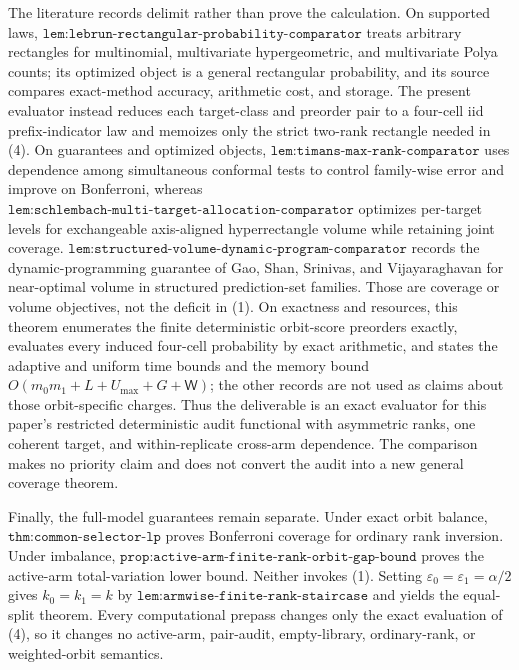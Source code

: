 The literature records delimit rather than prove the calculation. On supported laws, \(\texttt{lem:lebrun-rectangular-probability-comparator}\) treats arbitrary rectangles for multinomial, multivariate hypergeometric, and multivariate Polya counts; its optimized object is a general rectangular probability, and its source compares exact-method accuracy, arithmetic cost, and storage. The present evaluator instead reduces each target-class and preorder pair to a four-cell iid prefix-indicator law and memoizes only the strict two-rank rectangle needed in (4). On guarantees and optimized objects, \(\texttt{lem:timans-max-rank-comparator}\) uses dependence among simultaneous conformal tests to control family-wise error and improve on Bonferroni, whereas \(\texttt{lem:schlembach-multi-target-allocation-comparator}\) optimizes per-target levels for exchangeable axis-aligned hyperrectangle volume while retaining joint coverage. \(\texttt{lem:structured-volume-dynamic-program-comparator}\) records the dynamic-programming guarantee of Gao, Shan, Srinivas, and Vijayaraghavan for near-optimal volume in structured prediction-set families. Those are coverage or volume objectives, not the deficit in (1). On exactness and resources, this theorem enumerates the finite deterministic orbit-score preorders exactly, evaluates every induced four-cell probability by exact arithmetic, and states the adaptive and uniform time bounds and the memory bound \(O(m_0m_1+L+U_{\max}+G+\mathsf W)\); the other records are not used as claims about those orbit-specific charges. Thus the deliverable is an exact evaluator for this paper's restricted deterministic audit functional with asymmetric ranks, one coherent target, and within-replicate cross-arm dependence. The comparison makes no priority claim and does not convert the audit into a new general coverage theorem.

Finally, the full-model guarantees remain separate. Under exact orbit balance, \(\texttt{thm:common-selector-lp}\) proves Bonferroni coverage for ordinary rank inversion. Under imbalance, \(\texttt{prop:active-arm-finite-rank-orbit-gap-bound}\) proves the active-arm total-variation lower bound. Neither invokes (1). Setting \(\varepsilon_0=\varepsilon_1=\alpha/2\) gives \(k_0=k_1=k\) by \(\texttt{lem:armwise-finite-rank-staircase}\) and yields the equal-split theorem. Every computational prepass changes only the exact evaluation of (4), so it changes no active-arm, pair-audit, empty-library, ordinary-rank, or weighted-orbit semantics.